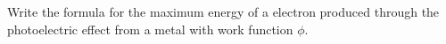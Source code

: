 

\vspace*{\fill}
\centering

Write the formula for the maximum energy of a electron produced through the photoelectric effect from a metal with work function $\phi$.

\centering
\vspace*{\fill}

